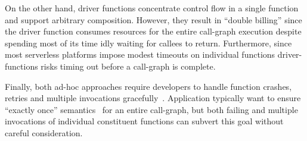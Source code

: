 

On the other hand, driver functions concentrate control flow in a single
function and support arbitrary composition. However, they result in ``double
billing'' since the driver function consumes resources for the entire call-graph
execution despite spending most of its time idly waiting for callees to return.
Furthermore, since most serverless platforms impose modest timeouts on
individual functions driver-functions risks timing out before a call-graph is
complete.

Finally, both ad-hoc approaches require developers to handle function crashes,
retries and multiple invocations gracefully~\cite{aws-lambda-retry,
azure-functions-retry, aws-lambda-async-invoke, azure-functions-exec-guarantee}.
Application typically want to ensure ``exactly once'' semantics~\cite{netherite,
beldi, boki, formal-foundation-exec-gtnee, durable-semantics} for an entire call-graph, but both
failing and multiple invocations of individual constituent functions can subvert
this goal without careful consideration.





